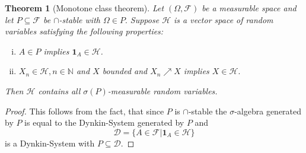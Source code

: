 \documentclass[12pt,a4paper]{scrartcl}
\newtheorem{theorem}{Theorem}[section]
\numberwithin{equation}{section}
\newcommand{\N}{\mathbb{N}} %
\begin{document}
\begin{theorem}[Monotone class theorem] \label{th:MonotoneClass}
Let $\left(\Omega, \mathcal{F} \right)$ be a measurable space and let $P \subseteq \mathcal{F}$ be $\cap$-stable with $\Omega \in P.$ Suppose $\mathcal{H}$ is a vector space of random variables satisfying the following properties:
\begin{enumerate}[(i)]
\item $A \in P$ implies $\textbf{1}_A \in \mathcal{H}$.
\item $X_n \in \mathcal{H}, n \in \N$ and $X$ bounded and $X_n \nearrow X$ implies $X \in \mathcal{H}.$
\end{enumerate}
Then $\mathcal{H}$ contains all $\sigma\left(P\right)$-measurable random variables.
\end{theorem}
\begin{proof}
This follows from the fact, that since $P$ is $\cap$-stable the $\sigma$-algebra generated by $P$ is equal to the Dynkin-System generated by $P$ and 
$$ \mathcal{D} = \lbrace A \in \mathcal{F} | \textbf{1}_A \in \mathcal{H} \rbrace $$
is a Dynkin-System with $P \subseteq \mathcal{D}$.
\end{proof}
\end{document}
